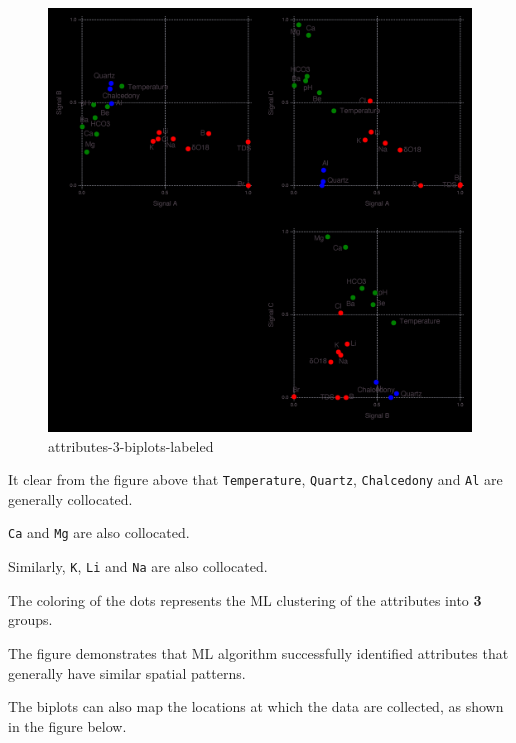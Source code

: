 \documentclass[11pt]{article}
\begin{document}
\begin{figure}
\centering
\includegraphics{../figures-postprocessing-nl-640/attributes-3-biplots-labeled.png}
\caption{attributes-3-biplots-labeled}
\end{figure}

It clear from the figure above that \texttt{Temperature},
\texttt{Quartz}, \texttt{Chalcedony} and \texttt{Al} are generally
collocated.

\texttt{Ca} and \texttt{Mg} are also collocated.

Similarly, \texttt{K}, \texttt{Li} and \texttt{Na} are also collocated.

The coloring of the dots represents the ML clustering of the attributes
into \textbf{3} groups.

The figure demonstrates that ML algorithm successfully identified
attributes that generally have similar spatial patterns.

The biplots can also map the locations at which the data are collected,
as shown in the figure below.
\end{document}
